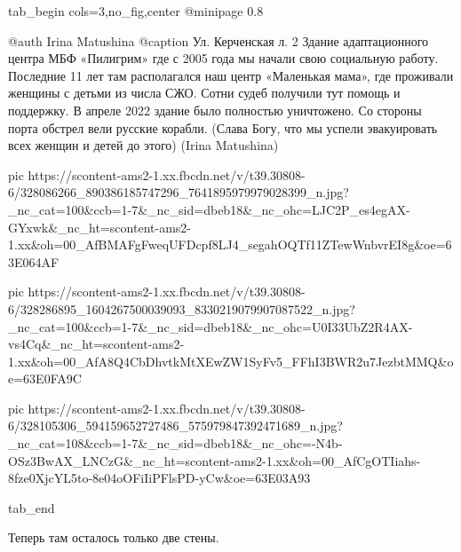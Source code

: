  
 
 
 
 


\ifcmt
  tab_begin cols=3,no_fig,center
     @minipage 0.8

     @auth Irina Matushina
     @caption Ул. Керченская л. 2 Здание адаптационного центра МБФ «Пилигрим» где с 2005 года мы начали свою социальную работу. Последние 11 лет там располагался наш центр «Маленькая мама», где проживали женщины с детьми из числа СЖО. Сотни судеб получили тут помощь и поддержку. В апреле 2022 здание было полностью уничтожено. Со стороны порта обстрел вели русские корабли. (Слава Богу, что мы успели эвакуировать всех женщин и детей до этого) (Irina Matushina)

     pic https://scontent-ams2-1.xx.fbcdn.net/v/t39.30808-6/328086266_890386185747296_7641895979979028399_n.jpg?_nc_cat=100&ccb=1-7&_nc_sid=dbeb18&_nc_ohc=LJC2P_es4egAX-GYxwk&_nc_ht=scontent-ams2-1.xx&oh=00_AfBMAFgFweqUFDcpf8LJ4_segahOQTf11ZTewWnbvrEI8g&oe=63E064AF

     pic https://scontent-ams2-1.xx.fbcdn.net/v/t39.30808-6/328286895_1604267500039093_8330219079907087522_n.jpg?_nc_cat=100&ccb=1-7&_nc_sid=dbeb18&_nc_ohc=U0I33UbZ2R4AX-vs4Cq&_nc_ht=scontent-ams2-1.xx&oh=00_AfA8Q4CbDhvtkMtXEwZW1SyFv5_FFhI3BWR2u7JezbtMMQ&oe=63E0FA9C

     pic https://scontent-ams2-1.xx.fbcdn.net/v/t39.30808-6/328105306_594159652727486_575979847392471689_n.jpg?_nc_cat=108&ccb=1-7&_nc_sid=dbeb18&_nc_ohc=-N4b-OSz3BwAX_LNCzG&_nc_ht=scontent-ams2-1.xx&oh=00_AfCgOTIiahs-8fze0XjcYL5to-8e04oOFiIiPFlsPD-yCw&oe=63E03A93

  tab_end
\fi


Теперь там осталось только две стены.
